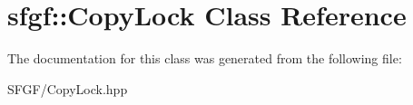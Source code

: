 \hypertarget{classsfgf_1_1CopyLock}{}\section{sfgf\+:\+:Copy\+Lock Class Reference}
\label{classsfgf_1_1CopyLock}


The documentation for this class was generated from the following file\+:\begin{DoxyCompactItemize}
\item 
S\+F\+G\+F/Copy\+Lock.\+hpp\end{DoxyCompactItemize}
